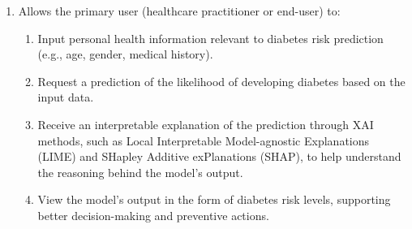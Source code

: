 \begin{enumerate}
    \item Allows the primary user (healthcare practitioner or end-user) to:
    \begin{enumerate}
        \item Input personal health information relevant to diabetes risk prediction (e.g., age, gender, medical history).
        \item Request a prediction of the likelihood of developing diabetes based on the input data.
        \item Receive an interpretable explanation of the prediction through XAI methods, such as Local Interpretable Model-agnostic Explanations (LIME) and SHapley Additive exPlanations (SHAP), to help understand the reasoning behind the model's output.
        \item View the model's output in the form of diabetes risk levels, supporting better decision-making and preventive actions.
    \end{enumerate}
    

\end{enumerate}
